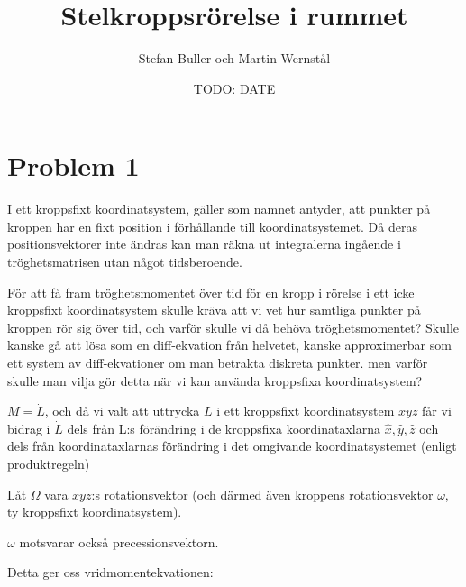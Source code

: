 \documentclass[12pt,a4paper]{article}
\begin{document}

\title{Stelkroppsrörelse i rummet}
	\author{Stefan Buller och Martin Wernstål}
	\date{TODO: DATE}
	\maketitle{}
	\thispagestyle{empty}

	\begin{abstract}
		
	\end{abstract}

\newpage{}

	\tableofcontents{}
	\thispagestyle{empty}

\newpage{}

	\setcounter{page}{1}
	\pagestyle{plain}
	
	
\section{Problem 1}
	
	I ett kroppsfixt koordinatsystem, gäller som namnet antyder, att punkter på kroppen
	har en fixt position i förhållande till koordinatsystemet. Då deras positionsvektorer
	inte ändras kan man räkna ut integralerna ingående i tröghetsmatrisen utan något tidsberoende.
	
	För att få fram tröghetsmomentet över tid för en kropp i rörelse i ett icke kroppsfixt
	koordinatsystem skulle kräva att vi vet hur samtliga punkter på kroppen rör sig över tid,
	och varför skulle vi då behöva tröghetsmomentet?
	Skulle kanske gå att lösa som en diff-ekvation från helvetet, kanske approximerbar som ett
	system av diff-ekvationer om man betrakta diskreta punkter. men varför skulle man vilja gör
	detta när vi kan använda kroppsfixa koordinatsystem?
	
	$M = \dot{L}$, och då vi valt att uttrycka $L$ i ett kroppsfixt koordinatsystem $xyz$ får vi
	bidrag i $\dot{L}$ dels från L:s förändring i de kroppsfixa koordinataxlarna
	$\hat{x},\hat{y},\hat{z}$ och dels från koordinataxlarnas förändring i det omgivande
	koordinatsystemet (enligt produktregeln)
	
	Låt $\Omega$ vara $xyz$:s rotationsvektor (och därmed även kroppens rotationsvektor $\omega$,
	ty kroppsfixt koordinatsystem).
	
	$\omega$ motsvarar också precessionsvektorn.
	
	
	Detta ger oss vridmomentekvationen:
	
\end{document}
